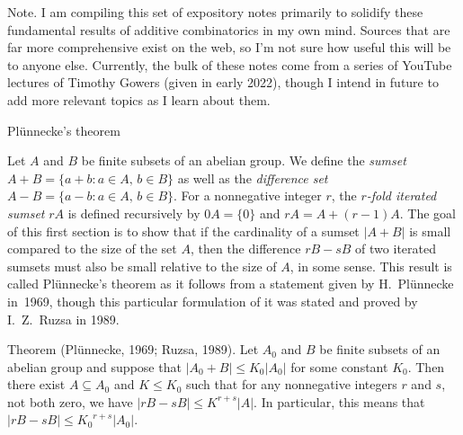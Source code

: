 


\def\FF{{\bf F}}
\def\TT{{\bf T}}
\def\bar{\overline}
\def\hat{\widehat}
\def\norm#1{|\!|#1|\!|}
\def\bignorm#1{\big|\!\big|#1\big|\!\big|}
\def\Norm#1{\Big|\!\Big|#1\Big|\!\Big|}
\def\normm#1{\bigg|\!\bigg|#1\bigg|\!\bigg|}
\def\mone{-\!\one}  %


\widemargins
{}


 \ninebf Note.
\ninepoint
I am compiling this set of expository notes primarily to solidify these fundamental results of
additive combinatorics in
my own mind. Sources that are far more comprehensive exist on the web, so I'm not sure
how useful this will be to anyone else. Currently, the bulk of these notes come from
a series of YouTube lectures of Timothy Gowers (given in early 2022), though I intend
in future to add more relevant topics as I learn about them.

\bigskip

\advsect Pl\"unnecke's theorem

Let $A$ and $B$ be finite subsets of an abelian group. We define the {\it sumset}
$A+B = \{a+b : a\in A,\, b\in B\}$ as well as the {\it difference set}
$A-B = \{a-b : a\in A,\, b\in B\}$. For a nonnegative integer $r$, the {\it $r$-fold iterated sumset}
$rA$ is defined recursively by $0A = \{0\}$ and $rA = A+(r-1)A$. The goal of this first section
is to show that if the cardinality of
a sumset $|A+B|$ is small compared to the size of the set $A$, then the difference
$rB-sB$ of two iterated sumsets must also be small relative to the size of $A$,
in some sense. This result is called Pl\"unnecke's
theorem as it follows from a statement given by H.~Pl\"unnecke in~1969, though this particular
formulation of it was stated and proved by I.~Z.~Ruzsa in 1989.

\edef\thmplunnecke{\the\thmcount}
\parenproclaim Theorem {\advthm} (Pl\"unnecke, {\rm 1969;} Ruzsa, {\rm 1989}). Let $A_0$ and
$B$ be finite subsets of an abelian group and suppose that $|A_0+B|\le K_0|A_0|$ for some constant $K_0$.
Then there exist $A\subseteq A_0$ and $K\le K_0$ such that
for any nonnegative integers $r$ and $s$, not both zero, we have $|rB-sB| \le K^{r+s}|A|$. In particular,
this means that $|rB-sB| \le {K_0}^{r+s}|A_0|$.

